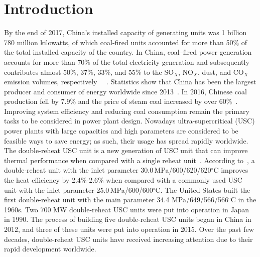 \documentclass[preprint,12pt]{elsarticle}
\begin{document}
\begin{multicols}{2}
\printnomenclature[1.5cm]{}
\end{multicols}



\section{Introduction}
\label{sec1:intro}

By the end of 2017, China's installed capacity of generating units was 1 billion 780 million kilowatts, of which coal-fired units accounted for more than 50\% of the total installed capacity of the country. 
In China, coal–fired power generation accounts for more than 70\% of the total electricity generation and subsequently contributes almost 50\%, 37\%, 33\%, and 55\% to the SO$_X$, NO$_X$, dust, and CO$_X$ emission volumes, respectively~\cite{Zhang2010Analysis} ~\cite{2018}.
Statistics show that China has been the largest producer and consumer of energy worldwide since 2013~\cite{Petroleum2014BP}. 
In 2016, Chinese coal production fell by 7.9\% and the price of steam coal increased by over 60\%~\cite{2017}. 
Improving system efficiency and reducing coal consumption remain the primary tasks to be considered in power plant design. Nowadays ultra-supercritical (USC) power plants with large capacities and high parameters are considered to be feasible ways to save energy; as such, their usage has spread rapidly worldwide.
The double-reheat USC unit is a new generation of USC unit that can improve thermal performance when compared with a single reheat unit~\cite{Zhao2017Exergy}. 
According to~\cite{Zhao2017Exergy}, a double-reheat unit with the inlet parameter 30.0\,MPa/600/620/620$^\circ$C improves the heat efficiency by 2.4\%-2.6\% when compared with a commonly used USC unit with the inlet parameter 25.0\,MPa/600/600$^\circ$C.
 The United States built the first double-reheat unit with the main parameter 34.4 MPa/649/566/566$^\circ$C in the 1960s.
 Two 700 MW double-reheat USC units were put into operation in Japan in 1990. 
 The process of building five double-reheat USC units began in China in 2012, and three of these units were put into operation in 2015.
 Over the past few decades, double-reheat USC units have received increasing attention due to their rapid development worldwide.

  
\end{document}
